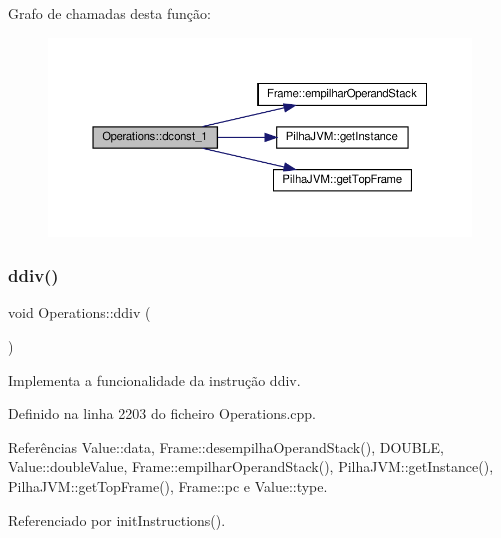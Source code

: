 Grafo de chamadas desta função\+:
\nopagebreak
\begin{figure}[H]
\begin{center}
\leavevmode
\includegraphics[width=350pt]{classOperations_a1a704891f81e3b532bf0eaad94429773_cgraph}
\end{center}
\end{figure}
\mbox{\label{classOperations_a3c323c9f0d40e68bf54cd449a55618c3}} 
\subsubsection{\texorpdfstring{ddiv()}{ddiv()}}
{\footnotesize\ttfamily void Operations\+::ddiv (\begin{DoxyParamCaption}{ }\end{DoxyParamCaption})\hspace{0.3cm}{\ttfamily [private]}}



Implementa a funcionalidade da instrução ddiv. 



Definido na linha 2203 do ficheiro Operations.\+cpp.



Referências Value\+::data, Frame\+::desempilha\+Operand\+Stack(), D\+O\+U\+B\+LE, Value\+::double\+Value, Frame\+::empilhar\+Operand\+Stack(), Pilha\+J\+V\+M\+::get\+Instance(), Pilha\+J\+V\+M\+::get\+Top\+Frame(), Frame\+::pc e Value\+::type.



Referenciado por init\+Instructions().

